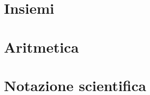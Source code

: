 \documentclass[
finale,
sectnum,
]{DossierExMathIta}
\author{CPT}
\date{2020}
\begin{document}
\setlength{\columnsep}{0.6cm}
\indice


\section{Insiemi}


\exnewpage



\section{Aritmetica}

\exnewpage

\section{Notazione scientifica}

\end{document}
